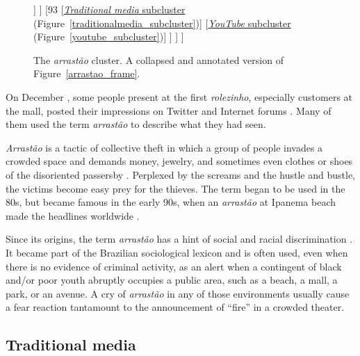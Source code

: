 \begin{figure}
\centering
\begin{forest}
[72, for tree={grow=east,anchor=west,child anchor=west}
	[{\hyperref[neocons_subcluster]{\emph{Neocons} subcluster} (Figure~\ref{neocons_subcluster})}]
	[74
		[80
			[{\autocite[][\emph{Rolezinho} in a neighboring town]{jornaldejundiai}}]
			[94
				[{\autocite[][Video: Girls in \emph{rolezinhos}]{uol_rolezeiras}}]
				[{\autocite[][\emph{Folha de S. Paulo}: The malls' perspective]{folha_shoppings_rolezodromos}}]
			]
		]
		[93
			[{\hyperref[traditionalmedia_subcluster]{\emph{Traditional media} subcluster} (Figure~\ref{traditionalmedia_subcluster})}]
			[{\hyperref[youtube_subcluster]{\emph{YouTube} subcluster} (Figure~\ref{youtube_subcluster})}]
		]
	]
]
\end{forest}
\caption{The \emph{arrastão} cluster. A collapsed and annotated version of Figure~\ref{arrastao_frame}.}
\label{arrastao_frame_annotated}
\end{figure}

On December , some people present at the first \emph{rolezinho}, especially customers at the mall, posted their impressions on Twitter \autocite{twitter_arrastao_itaquera} and Internet forums \autocite{forum_jogos_uol}. Many of them used the term \emph{arrastão} to describe what they had seen.

\emph{Arrastão} is a tactic of collective theft in which a group of people invades a crowded space and demands money, jewelry, and sometimes even clothes or shoes of the disoriented passersby \autocite{npr_arrastao}. Perplexed by the screams and the hustle and bustle, the victims become easy prey for the thieves. The term began to be used in the 80s, but became famous in the early 90s, when an \emph{arrastão} at Ipanema beach made the headlines worldwide \autocite{youtube_arrastao}.

Since its origins, the term \emph{arrastão} has a hint of social and racial discrimination \autocite{francisco2003arrastao}. It became part of the Brazilian sociological lexicon and is often used, even when there is no evidence of criminal activity, as an alert when a contingent of black and/or poor youth abruptly occupies a public area, such as a beach, a mall, a park, or an avenue. A cry of \emph{arrastão} in any of those environments usually cause a fear reaction tantamount to the announcement of \enquote{fire} in a crowded theater.

\subsection*{Traditional media}

